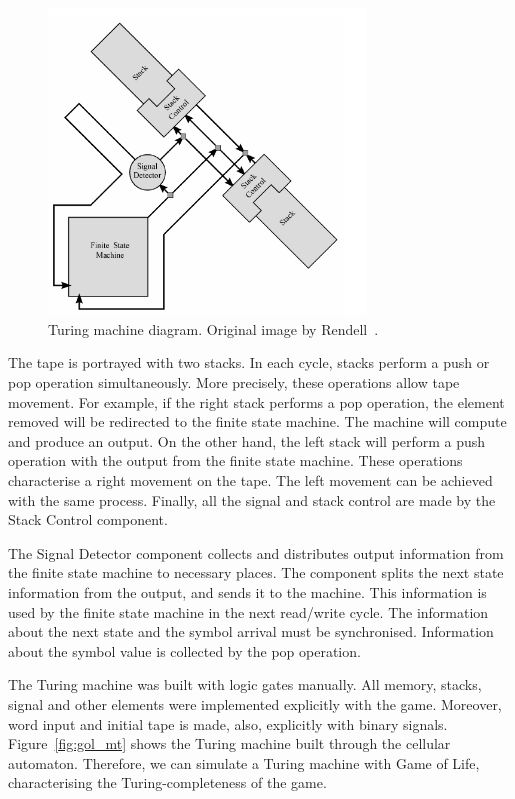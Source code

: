 \documentclass[12pt]{article}
\begin{document}
\begin{figure}[h]
    \centering
    \includegraphics[width=0.75\textwidth]{images/gol-tm-high.pdf}
    \caption{Turing machine diagram. Original image by
        Rendell~\cite{Rendell:inproc:2011:jul}.}
    \label{fig:gol_mt_highlevel}
\end{figure}

The tape is portrayed with two stacks. In each cycle, stacks perform a push or
pop operation simultaneously. More precisely, these operations allow tape
movement. For example, if the right stack performs a pop operation, the element
removed will be redirected to the finite state machine. The machine will
compute and produce an output. On the other hand, the left stack will perform a
push operation with the output from the finite state machine. These operations
characterise a right movement on the tape. The left movement can be achieved
with the same process. Finally, all the signal and stack control are made by
the Stack Control component.

The Signal Detector component collects and distributes output information from
the finite state machine to necessary places. The component splits the next
state information from the output, and sends it to the machine. This
information is used by the finite state machine in the next read/write cycle.
The information about the next state and the symbol arrival must be
synchronised. Information about the symbol value is collected by the pop
operation.

The Turing machine was built with logic gates manually. All memory, stacks,
signal and other elements were implemented explicitly with the game. Moreover,
word input and initial tape is made, also, explicitly with binary signals.
Figure~\ref{fig:gol_mt} shows the Turing machine built through the cellular
automaton. Therefore, we can simulate a Turing machine with Game of Life,
characterising the Turing-completeness of the game.
\end{document}
